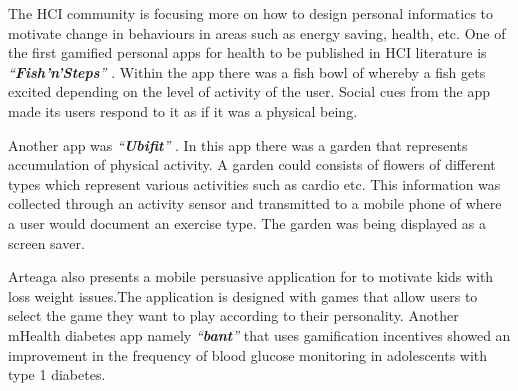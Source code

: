 \documentclass{sig-alternate}
\begin{document}
The HCI community is focusing more on  how to design personal informatics to motivate change in behaviours in areas such as energy saving, health, etc. One of the first gamified personal apps for health to be published in HCI literature is \emph{``\textbf{Fish'n'Steps}''} \cite{lin2006:fish}. Within the app there  was a fish bowl of whereby a fish gets excited depending on the level of activity of the user. Social cues from the app made its users respond to it as if it was a physical being.

Another app was \emph{``\textbf{Ubifit}''} \cite{klasnja2009:using}. In this app there was a garden that represents accumulation of physical activity. A garden could consists of flowers of different types which represent various activities such as cardio etc. This information was collected through an activity sensor and transmitted to a mobile phone of where a user would document an exercise type. The garden was being displayed as a screen saver.

Arteaga \cite{arteaga2010:persuasive} also presents a mobile persuasive application for to motivate kids with loss weight issues.The application is designed with games that allow users to select the game they want to play according to their personality. Another mHealth diabetes app namely \emph{``\textbf{bant}''} that uses gamification incentives showed an improvement in the frequency of blood glucose monitoring in adolescents with type 1 diabetes.
\end{document}
